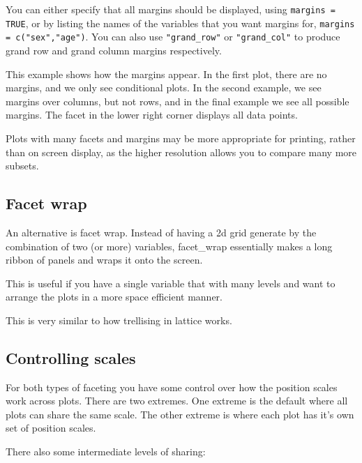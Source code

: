 You can either specify that all margins should be displayed, using {\tt margins = TRUE}, or by listing the names of the variables that you want margins for, {\tt margins = c("sex","age")}.  You can also use \verb|"grand_row"| or \verb|"grand_col"| to produce grand row and grand column margins respectively.

This example shows how the margins appear.  In the first plot, there are no margins, and we only see conditional plots.  In the second example, we see margins over columns, but not rows, and in the final example we see all possible margins.  The facet in the lower right corner displays all data points.

\begin{alltt}

\end{alltt}

Plots with many facets and margins may be more appropriate for printing, rather than on screen display, as the higher resolution allows you to compare many more subsets.

\subsection{Facet wrap}
\label{sub:facet_wrap}

An alternative is facet wrap.  Instead of having a 2d grid generate by the combination of two (or more) variables, facet\_wrap essentially makes a long ribbon of panels and wraps it onto the screen.  

This is useful if you have a single variable that with many levels and want to arrange the plots in a more space efficient manner.

This is very similar to how trellising in lattice works.

\subsection{Controlling scales}
\label{sub:controlling_scales}

For both types of faceting you have some control over how the position scales work across plots.  There are two extremes.  One extreme is the default where all plots can share the same scale.  The other extreme is where each plot has it's own set of position scales.  

There also some intermediate levels of sharing:

